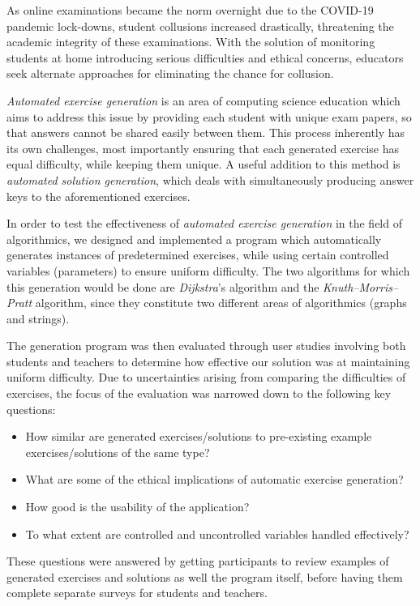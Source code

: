 \documentclass{l4proj}
\begin{document}
As online examinations became the norm overnight due to the COVID-19 pandemic lock-downs, student collusions increased drastically, threatening the academic integrity of these examinations. With the solution of monitoring students at home introducing serious difficulties and ethical concerns, educators seek alternate approaches for eliminating the chance for collusion.

\emph{Automated exercise generation} is an area of computing science education which aims to address this issue by providing each student with unique exam papers, so that answers cannot be shared easily between them. This process inherently has its own challenges, most importantly ensuring that each generated exercise has equal difficulty, while keeping them unique. A useful addition to this method is \emph{automated solution generation}, which deals with simultaneously producing answer keys to the aforementioned exercises.

In order to test the effectiveness of \emph{automated exercise generation} in the field of algorithmics, we designed and implemented a program which automatically generates instances of predetermined exercises, while using certain controlled variables (parameters) to ensure uniform difficulty. The two algorithms for which this generation would be done are \emph{Dijkstra}'s algorithm and the \emph{Knuth–Morris–Pratt} algorithm, since they constitute two different areas of algorithmics (graphs and strings).

The generation program was then evaluated through user studies involving both students and teachers to determine how effective our solution was at maintaining uniform difficulty. Due to uncertainties arising from comparing the difficulties of exercises, the focus of the evaluation was narrowed down to the following key questions:

\begin{itemize}
	\item
	How similar are generated exercises/solutions to pre-existing example exercises/solutions of the same type?
	\item
	What are some of the ethical implications of automatic exercise generation?
	\item
	How good is the usability of the application?
	\item
	To what extent are controlled and uncontrolled variables handled effectively?
\end{itemize}

These questions were answered by getting participants to review examples of generated exercises and solutions as well the program itself, before having them complete separate surveys for students and teachers. 
\end{document}

